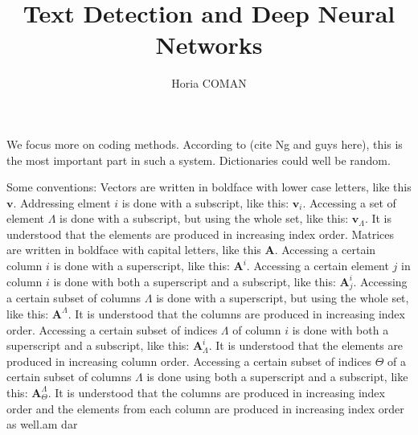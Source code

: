\documentclass[12pt,a4paper,oneside,english]{UPBThesis}
\begin{document}
\author{Horia COMAN}

\title{Text Detection and Deep Neural Networks}



\beforepreface
\listoffigures
\listoftables
{}
\afterpreface


We focus more on coding methods. According to (cite Ng and guys here), this is the most important part in such a system. Dictionaries could well be random.

Some conventions: Vectors are written in boldface with lower case letters, like this $\textbf{v}$. Addressing elment $i$ is done with a subscript, like this: $\textbf{v}_i$. Accessing a set of element $\Lambda$ is done with a subscript, but using the whole set, like this: $\textbf{v}_\Lambda$. It is understood that the elements are produced in increasing index order. Matrices are written in boldface with capital letters, like this $\textbf{A}$. Accessing a certain column $i$ is done with a superscript, like this: $\textbf{A}^i$. Accessing a certain element $j$ in column $i$ is done with both a superscript and a subscript, like this: $\textbf{A}^i_j$. Accessing a certain subset of columns $\Lambda$ is done with a superscript, but using the whole set, like this: $\textbf{A}^\Lambda$. It is understood that the columns are produced in increasing index order. Accessing a certain subset of indices $\Lambda$ of column $i$ is done with both a superscript and a subscript, like this: $\textbf{A}^i_\Lambda$. It is understood that the elements are produced in increasing column order. Accessing a certain subset of indices $\Theta$ of a certain subset of columns $\Lambda$ is done using both a superscript and a subscript, like this: $\textbf{A}^\Lambda_\Theta$. It is understood that the columns are produced in increasing index order and the elements from each column are produced in increasing index order as well.am dar 
\end{document}
